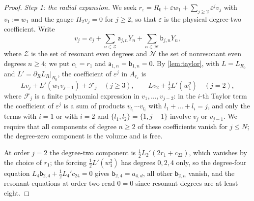 \documentclass[11pt]{amsart}
\numberwithin{equation}{section}
\theoremstyle{definition}
\theoremstyle{remark}
\newcommand{\eps}{\varepsilon}
\begin{document}
\begin{proof}
\emph{Step 1: the radial expansion.} We seek $r_\eps=R_0+\eps w_1+\sum_{j\ge2}\eps^jv_j$ with $v_1:=w_1$ and the gauge $\Pi_2v_j=0$ for $j\ge2$, so that $\eps$ is the physical degree-two coefficient. Write
\[
v_j=c_j+\sum_{n\in\mathcal Z}\mathsf a_{j,n}Y_n+\sum_{n\in\mathcal N}\mathsf b_{j,n}Y_n,
\]
where $\mathcal Z$ is the set of resonant even degrees and $\mathcal N$ the set of nonresonant even degrees $n\ge4$; we put $c_1=r_1$ and $\mathsf a_{1,n}=\mathsf b_{1,n}=0$. By \cref{lem:taylor}, with $L=L_{R_0}$ and $L'=\partial_RL_R|_{R_0}$, the coefficient of $\eps^j$ in $A_{r_\eps}$ is
\[
Lv_j+L'(w_1v_{j-1})+\mathcal F_j\quad(j\ge3),\qquad Lv_2+\tfrac12L'(w_1^2)\quad(j=2),
\]
where $\mathcal F_j$ is a finite polynomial expression in $v_1,\dots,v_{j-2}$: in the $i$-th Taylor term the coefficient of $\eps^j$ is a sum of products $v_{l_1}\cdots v_{l_i}$ with $l_1+\dots+l_i=j$, and only the terms with $i=1$ or with $i=2$ and $\{l_1,l_2\}=\{1,j-1\}$ involve $v_j$ or $v_{j-1}$. We require that all components of degree $n\ge2$ of these coefficients vanish for $j\le N$; the degree-zero component is the volume and is free.

At order $j=2$ the degree-two component is $\frac12L_2'(2r_1+c_{22})$, which vanishes by the choice of $r_1$; the forcing $\frac12L'(w_1^2)$ has degrees $0,2,4$ only, so the degree-four equation $L_4\mathsf b_{2,4}+\frac12L_4'c_{24}=0$ gives $\mathsf b_{2,4}=a_{4,d}$, all other $\mathsf b_{2,n}$ vanish, and the resonant equations at order two read $0=0$ since resonant degrees are at least eight.


\end{proof}
\end{document}
